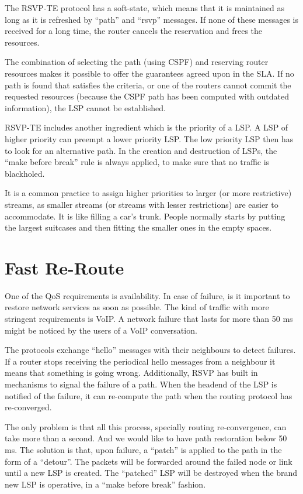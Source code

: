 The RSVP-TE protocol has a soft-state, which means that it is maintained as long as it is refreshed by ``path'' and ``rsvp'' messages.
If none of these messages is received for a long time, the router cancels the reservation and frees the resources.

The combination of selecting the path (using CSPF) and reserving router resources makes it possible to offer the guarantees agreed upon in the SLA.
If no path is found that satisfies the criteria, or one of the routers cannot commit the requested resources (because the CSPF path has been computed with outdated information), the LSP cannot be established.

RSVP-TE includes another ingredient which is the priority of a LSP.
A LSP of higher priority can preempt a lower priority LSP.
The low priority LSP then has to look for an alternative path.
In the creation and destruction of LSPs, the ``make before break'' rule is always applied, to make sure that no traffic is blackholed.

It is a common practice to assign higher priorities to larger (or more restrictive) streams, as smaller streams (or streams with lesser restrictions) are easier to accommodate.
It is like filling a car's trunk. 
People normally starts by putting the largest suitcases and then fitting the smaller ones in the empty spaces.

\section{Fast Re-Route}

One of the QoS requirements is availability.
In case of failure, is it important to restore network services as soon as possible.
The kind of traffic with more stringent requirements is VoIP.
A network failure that lasts for more than 50 ms might be noticed by the users of a VoIP conversation.

The protocols exchange ``hello'' messages with their neighbours to detect failures.
If a router stops receiving the periodical hello messages from a neighbour it means that something is going wrong.
Additionally, RSVP has built in mechanisms to signal the failure of a path.
When the headend of the LSP is notified of the failure, it can re-compute the path when the routing protocol has re-converged.

The only problem is that all this process, specially routing re-convergence, can take more than a second.
And we would like to have path restoration below 50 ms.
The solution is that, upon failure, a ``patch'' is applied to the path in the form of a ``detour''.
The packets will be forwarded around the failed node or link until a new LSP is created.
The ``patched'' LSP will be destroyed when the brand new LSP is operative, in a ``make before break'' fashion.

